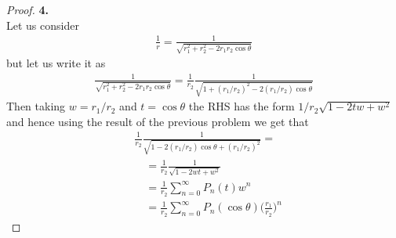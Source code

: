 \documentclass[11pt]{article}
\theoremstyle{definition}
\begin{document}
\cleardoublepage
\begin{proof}{\textbf{4.}}\\
Let us consider 
\begin{align*}
    \frac{1}{r} = \frac{1}{\sqrt{r_1^2 + r_2^2 - 2r_1r_2\cos\theta}}
\end{align*}
but let us write it as
\begin{align*}
    \frac{1}{\sqrt{r_1^2 + r_2^2 - 2r_1r_2\cos\theta}}
    = \frac{1}{r_2}\frac{1}{\sqrt{1 + (r_1/r_2)^2 - 2(r_1/r_2)\cos\theta}}
\end{align*}
Then taking $w = r_1/r_2$ and $t = \cos\theta$ the RHS has the form 
$1 /r_2 \sqrt{1 - 2tw + w^2}$ and hence using the result of the previous
problem we get that
\begin{align*}
    &\frac{1}{r_2}\frac{1}{\sqrt{1 - 2(r_1/r_2)\cos\theta + (r_1/r_2)^2}} =\\
    &\quad= \frac{1}{r_2}\frac{1}{\sqrt{1 - 2wt + w^2}}\\
    &\quad= \frac{1}{r_2}\sum_{n=0}^\infty P_n(t)w^n\\
    &\quad= \frac{1}{r_2}\sum_{n=0}^\infty P_n(\cos\theta)
    \bigg(\frac{r_1}{r_2}\bigg)^n
\end{align*}
\end{proof}
\end{document}
